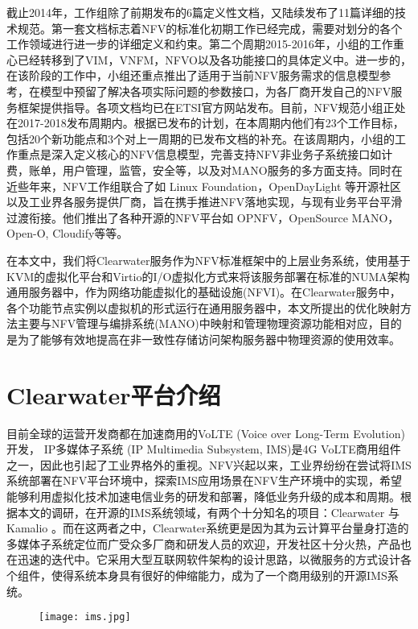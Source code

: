 截止2014年，工作组除了前期发布的6篇定义性文档，又陆续发布了11篇详细的技术规范。第一套文档标志着NFV的标准化初期工作已经完成，需要对划分的各个工作领域进行进一步的详细定义和约束。第二个周期2015-2016年，小组的工作重心已经转移到了VIM，VNFM，NFVO以及各功能接口的具体定义中。进一步的，在该阶段的工作中，小组还重点推出了适用于当前NFV服务需求的信息模型参考，在模型中预留了解决各项实际问题的参数接口，为各厂商开发自己的NFV服务框架提供指导。各项文档均已在ETSI官方网站发布。目前，NFV规范小组正处在2017-2018发布周期内。根据已发布的计划，在本周期内他们有23个工作目标，包括20个新功能点和3个对上一周期的已发布文档的补充。在该周期内，小组的工作重点是深入定义核心的NFV信息模型，完善支持NFV非业务子系统接口如计费，账单，用户管理，监管，安全等，以及对MANO服务的多方面支持。同时在近些年来，NFV工作组联合了如 Linux Foundation，OpenDayLight 等开源社区以及工业界各服务提供厂商，旨在携手推进NFV落地实现，与现有业务平台平滑过渡衔接。他们推出了各种开源的NFV平台如 OPNFV，OpenSource MANO，Open-O, Cloudify等等。

在本文中，我们将Clearwater服务作为NFV标准框架中的上层业务系统，使用基于KVM的虚拟化平台和Virtio的I/O虚拟化方式来将该服务部署在标准的NUMA架构通用服务器中，作为网络功能虚拟化的基础设施(NFVI)。在Clearwater服务中，各个功能节点实例以虚拟机的形式运行在通用服务器中，本文所提出的优化映射方法主要与NFV管理与编排系统(MANO)中映射和管理物理资源功能相对应，目的是为了能够有效地提高在非一致性存储访问架构服务器中物理资源的使用效率。

\section{Clearwater平台介绍}
\label{intro:clearwater}
目前全球的运营开发商都在加速商用的VoLTE (Voice over Long-Term Evolution) 开发， IP多媒体子系统 (IP Multimedia Subsystem, IMS)是4G VoLTE商用组件之一，因此也引起了工业界格外的重视。NFV兴起以来，工业界纷纷在尝试将IMS系统部署在NFV平台环境中，探索IMS应用场景在NFV生产环境中的实现，希望能够利用虚拟化技术加速电信业务的研发和部署，降低业务升级的成本和周期。根据本文的调研，在开源的IMS系统领域，有两个十分知名的项目：Clearwater 与 Kamalio 。而在这两者之中，Clearwater系统更是因为其为云计算平台量身打造的多媒体子系统定位而广受众多厂商和研发人员的欢迎，开发社区十分火热，产品也在迅速的迭代中。它采用大型互联网软件架构的设计思路，以微服务的方式设计各个组件，使得系统本身具有很好的伸缩能力，成为了一个商用级别的开源IMS系统。
\begin{figure}[!htp]
	\centering
	\texttt{[image: ims.jpg]}
\end{figure}

